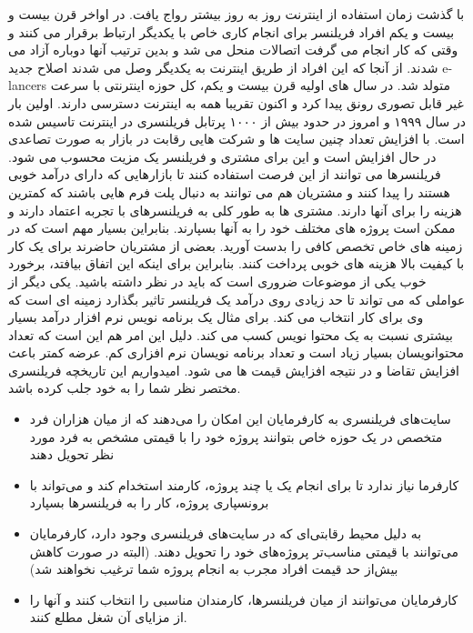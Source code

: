 با گذشت زمان استفاده از اینترنت روز به روز بیشتر رواج یافت. در اواخر قرن بیست و بیست و یکم افراد فریلنسر برای انجام کاری خاص با یکدیگر ارتباط برقرار می کنند و وقتی که کار انجام می گرفت اتصالات منحل می شد و بدین ترتیب آنها دوباره آزاد می شدند. از آنجا که این افراد از طریق اینترنت به یکدیگر وصل می شدند اصلاح جدید e-lancers متولد شد. در سال های اولیه قرن بیست و یکم، کل حوزه اینترنتی با سرعت غیر قابل تصوری رونق پیدا کرد و اکنون تقریبا همه به اینترنت دسترسی دارند. اولین بار در سال ۱۹۹۹ و امروز در حدود بیش از ۱۰۰۰ پرتابل فریلنسری در اینترنت تاسیس شده است. با افزایش تعداد چنین سایت ها و شرکت هایی رقابت در بازار به صورت تصاعدی در حال افزایش است و این برای مشتری و فریلنسر یک مزیت محسوب می شود. فریلنسرها می توانند از این فرصت استفاده کنند تا بازارهایی که دارای درآمد خوبی هستند را پیدا کنند و مشتریان هم می توانند به دنبال پلت فرم هایی باشند که کمترین هزینه را برای آنها دارند.
مشتری ها به طور کلی به فریلنسرهای با تجربه اعتماد دارند و ممکن است پروژه های مختلف خود را به آنها بسپارند. بنابراین بسیار مهم است که در زمینه های خاص تخصص کافی را بدست آورید. بعضی از مشتریان حاضرند برای یک کار با کیفیت بالا هزینه های خوبی پرداخت کنند. بنابراین برای اینکه این اتفاق بیافتد، برخورد خوب یکی از موضوعات ضروری است که باید در نظر داشته باشید. یکی دیگر از عواملی که می تواند تا حد زیادی روی درآمد یک فریلنسر تاثیر بگذارد زمینه ای است که وی برای کار انتخاب می کند. برای مثال یک برنامه نویس نرم افزار درآمد بسیار بیشتری نسبت به یک محتوا نویس کسب می کند. دلیل این امر هم این است که تعداد محتوانویسان بسیار زیاد است و تعداد برنامه نویسان نرم افزاری کم. عرضه کمتر باعث افزایش تقاضا و در نتیجه افزایش قیمت ها می شود. امیدواریم این تاریخچه فریلنسری مختصر نظر شما را به خود جلب کرده باشد.
\begin{itemize}
	\item
	 سایت‌های فریلنسری به کارفرمایان این امکان را می‌دهند که از میان هزاران فرد متخصص در یک حوزه خاص بتوانند پروژه خود را با قیمتی مشخص به فرد مورد نظر تحویل دهند
	 \item
	کارفرما نیاز ندارد تا برای انجام یک یا چند پروژه، کارمند استخدام کند و می‌تواند با برونسپاری پروژه، کار را به فریلنسرها بسپارد
	\item
	به دلیل محیط رقابتی‌ای که در سایت‌های فریلنسری وجود دارد، کارفرمایان می‌توانند با قیمتی مناسب‌تر پروژه‌های خود را تحویل دهند. (البته در صورت کاهش بیش‌از حد قیمت افراد مجرب به انجام پروژه شما ترغیب نخواهند شد)
	\item
	کارفرمایان می‌توانند از میان فریلنسرها، کارمندان مناسبی را انتخاب کنند و آنها را از مزایای آن شغل مطلع کنند.
\end{itemize}

